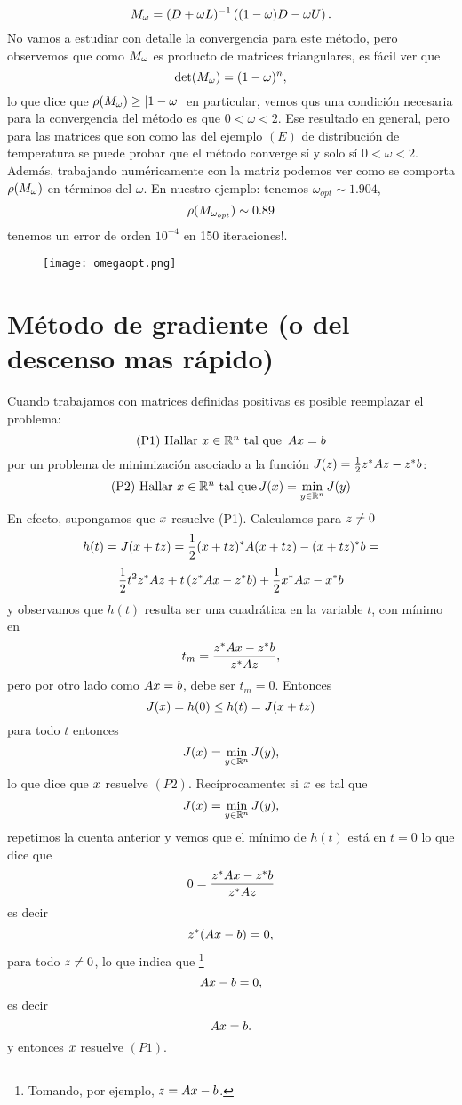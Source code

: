 $$
\Mb_\omega=(\Db+\omega \Lb)^{-1}\left((1-\omega)\Db-\omega\Ub\right).
$$
No vamos a estudiar con detalle la convergencia para este método, pero observemos que como $\Mb_\omega$ es producto de matrices triangulares, es fácil ver que  
$$
\det (\Mb_\omega)=(1-\omega)^n,
$$
lo que dice que 
$\rho(\Mb_\omega)\ge |1-\omega|$
en particular, vemos qus una condición necesaria para la convergencia del  m\'etodo  es que $0<\omega<2$. 
\tcc
Ese resultado en general, pero para las matrices que son como las del ejemplo $(E)$ de distribución de temperatura se puede probar que el método converge sí y solo sí $0<\omega<2$. Además, trabajando numéricamente con la matriz podemos ver como se comporta $\rho(\Mb_\omega)$ en términos del $\omega$. En nuestro ejemplo:
tenemos $\omega_{opt}\sim 1.904$,
$$
\rho(\Mb_{\omega_{opt}})\sim 0.89
$$
tenemos un error de orden $10^{-4}$ en 150 iteraciones!.
\etcc

\begin{figure}[h]
\centering\texttt{[image: omegaopt.png]}
\end{figure}

\section{Método de gradiente (o del descenso mas rápido)}

Cuando trabajamos con matrices definidas positivas es posible reemplazar el problema:
$$
\mbox{(P1) Hallar $\xb\in \R^n$ tal que
}\,\Ab\xb=\bb
$$
por un problema de minimización  asociado a la función $J(\zb)=\frac{1}{2}\zb^*\Ab\zb-\zb^*\bb$:
$$
\mbox{(P2) Hallar $\xb\in \Rn$ tal que}\, J(\xb)=
\min_{\yb\in \R^n}J(\yb)
$$
En efecto, supongamos que $\xb$ resuelve (P1). Calculamos para $\zb\ne\cero$
$$
h(t)=J(\xb+t\zb)= \frac{1}{2}(\xb+t\zb)^*\Ab(\xb+t\zb)-(\xb+t\zb)^*\bb=
$$
$$
\frac{1}{2}t^2\zb^*\Ab\zb+t\left(\zb^*\Ab\xb-\zb^*\bb\right) +\frac{1}{2}\xb^*\Ab\xb-\xb^*\bb
$$
y observamos que $h(t)$ resulta ser una cuadr\'atica en la variable $t$, con mínimo en
$$
t_m=\frac{\zb^*\Ab\xb-\zb^*\bb}{\zb^*\Ab\zb},
$$
pero por otro lado como $\Ab\xb=\bb$, debe ser $t_m=0$. Entonces
$$
J(\xb)=h(0)\le h(t)=J(\xb+t\zb)
$$
para todo $t$ entonces
$$
J(\xb)=\min_{\yb\in\Rn}J(\yb),
$$
lo que dice que $\xb$ resuelve $(P2)$.
Recíprocamente: si $\xb$ es tal que 
$$
J(\xb)=\min_{\yb\in\Rn}J(\yb),
$$
repetimos la cuenta anterior y vemos que el mínimo de $h(t)$ está en $t=0$ lo que dice que
$$0=\frac{\zb^*\Ab\xb-\zb^*\bb}{\zb^*\Ab\zb}
$$
es decir
$$
\zb^*(\Ab\xb-\bb)=0,
$$
para todo $\zb\neq \cero$, lo que indica que \footnote{Tomando, por ejemplo, $\zb=\Ab\xb-\bb$.}
$$
\Ab\xb-\bb=\cero,
$$
es decir
$$
\Ab\xb=\bb.
 $$
 y entonces $\xb$ resuelve $(P1)$.

